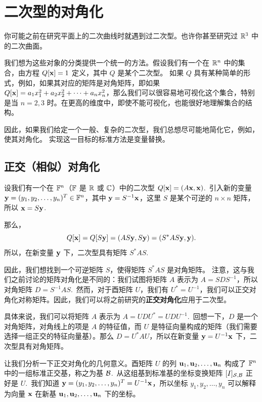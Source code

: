 \section{二次型的对角化}\label{sec:07-02}

你可能之前在研究平面上的二次曲线时就遇到过二次型。也许你甚至研究过 $\mathbb{R}^3$ 中的二次曲面。

我们想为这些对象的分类提供一个统一的方法。假设我们有一个在 $\mathbb{R}^n$ 中的集合，由方程 $Q[\mathbf{x}] = 1$ 定义，其中 $Q$ 是某个二次型。
如果 $Q$ 具有某种简单的形式，例如，如果其对应的矩阵是对角矩阵，即如果 $Q[\mathbf{x}] = a_1x_1^2 + a_2x_2^2 + \dots + a_nx_n^2$，那么我们可以很容易地可视化这个集合，特别是当 $n=2, 3$ 时。在更高的维度中，即使不能可视化，也能很好地理解集合的结构。

因此，如果我们给定一个一般、复杂的二次型，我们总想尽可能地简化它，例如，使其对角化。
实现这一目标的标准方法是变量替换。

\subsection{正交（相似）对角化}\label{sec:07-02-01}

设我们有一个在 $\mathbb{F}^n$（$\mathbb{F}$ 是 $\mathbb{R}$ 或 $\mathbb{C}$）中的二次型 $Q[\mathbf{x}] = (A\mathbf{x}, \mathbf{x})$.~引入新的变量 $\mathbf{y} = (y_1, y_2, \dots, y_n)^T \in \mathbb{F}^n$，其中 $\mathbf{y} = S^{-1}\mathbf{x}$，这里 $S$ 是某个可逆的 $n \times n$ 矩阵，所以 $\mathbf{x} = S\mathbf{y}$.~

那么，
$$Q[\mathbf{x}] = Q[S\mathbf{y}] = (AS\mathbf{y}, S\mathbf{y}) = (S^*AS\mathbf{y}, \mathbf{y}).$$
所以，在新变量 $\mathbf{y}$ 下，二次型具有矩阵 $S^*AS$.~

因此，我们想找到一个可逆矩阵 $S$，使得矩阵 $S^*AS$ 是对角矩阵。
注意，这与我们之前讨论的矩阵对角化是不同的：我们试图将矩阵 $A$ 表示为 $A = SDS^{-1}$，所以对角矩阵 $D = S^{-1}AS$.~然而，对于酉矩阵 $U$，我们有 $U^* = U^{-1}$，我们可以正交对角化对称矩阵。因此，我们可以将之前研究的\textbf{正交对角化}应用于二次型。

具体来说，我们可以将矩阵 $A$ 表示为 $A = UDU^* = UDU^{-1}$.~回想一下，$D$ 是一个对角矩阵，对角线上的项是 $A$ 的特征值，而 $U$ 是特征向量构成的矩阵（我们需要选择一组正交的特征向量基）。那么 $D = U^*AU$，所以在新变量 $\mathbf{y} = U^{-1}\mathbf{x}$ 下，二次型具有对角矩阵。

让我们分析一下正交对角化的几何意义。酉矩阵 $U$ 的列 $\mathbf{u}_1, \mathbf{u}_2, \dots, \mathbf{u}_n$ 构成了 $\mathbb{F}^n$ 中的一组标准正交基，称之为基 $\mathcal{B}$.~从这组基到标准基的坐标变换矩阵 $[I]_{\mathcal{S},\mathcal{B}}$ 正好是 $U$.~我们知道 $\mathbf{y} = (y_1, y_2, \dots, y_n)^T = U^{-1}\mathbf{x}$，所以坐标 $y_1, y_2, \dots, y_n$ 可以解释为向量 $\mathbf{x}$ 在新基 $\mathbf{u}_1, \mathbf{u}_2, \dots, \mathbf{u}_n$ 下的坐标。

